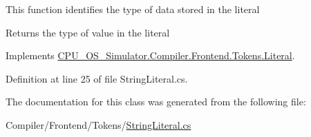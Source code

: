 This function identifies the type of data stored in the literal 

\begin{DoxyReturn}{Returns}
the type of value in the literal
\end{DoxyReturn}


Implements \hyperlink{class_c_p_u___o_s___simulator_1_1_compiler_1_1_frontend_1_1_tokens_1_1_literal_a34d05c00ded660daf66f91bd2543d186}{C\+P\+U\+\_\+\+O\+S\+\_\+\+Simulator.\+Compiler.\+Frontend.\+Tokens.\+Literal}.



Definition at line 25 of file String\+Literal.\+cs.



The documentation for this class was generated from the following file\+:\begin{DoxyCompactItemize}
\item 
Compiler/\+Frontend/\+Tokens/\hyperlink{_string_literal_8cs}{String\+Literal.\+cs}\end{DoxyCompactItemize}
